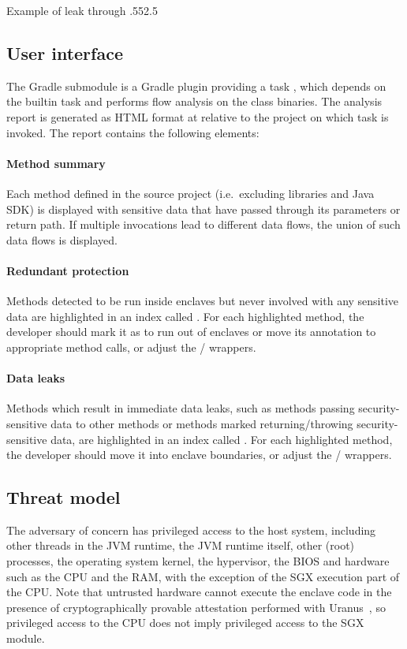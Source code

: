 {Example of leak through }{.55}{2.5}

\subsection{User interface}\label{subsec:user-interface}
The  Gradle submodule
is a Gradle plugin providing a task ,
which depends on the  builtin task
and performs flow analysis on the class binaries.
The analysis report is generated as HTML format at
relative to the project on which task is invoked.
The report contains the following elements:

\paragraph{Method summary}
Each method defined in the source project (i.e.\ excluding libraries and Java \ac{SDK})
is displayed with sensitive data that have passed through its parameters or return path.
If multiple invocations lead to different data flows,
the union of such data flows is displayed.

\paragraph{Redundant protection}
Methods detected to be run inside enclaves but never involved with any sensitive data
are highlighted in an index called .
For each highlighted method, the developer
should mark it as  to run out of enclaves
or move its  annotation to appropriate method calls,
or adjust the / wrappers.

\paragraph{Data leaks}
Methods which result in immediate data leaks,
such as methods passing security-sensitive data to other  methods
or methods marked  returning/throwing security-sensitive data,
are highlighted in an index called .
For each highlighted method, the developer
should move it into enclave boundaries,
or adjust the / wrappers.

\subsection{Threat model}\label{subsec:threat-model}
The adversary of concern has privileged access to the host system,
including other threads in the \ac{JVM} runtime, the \ac{JVM} runtime itself,
other (root) processes, the operating system kernel,
the hypervisor, the BIOS and hardware such as the CPU and the RAM,
with the exception of the \ac{SGX} execution part of the CPU\@.
Note that untrusted hardware cannot execute the enclave code
in the presence of cryptographically provable attestation performed with Uranus~\cite{uranus},
so privileged access to the CPU does not imply privileged access to the \ac{SGX} module.

